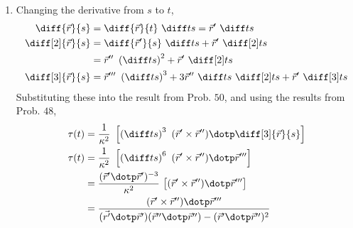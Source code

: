 \begin{enumerate}
    \item Changing the derivative from $ s $ to $ t $,
          \begin{align}
              \diff{\vec{r}}{s}    & = \diff{\vec{r}}{t}\ \diff ts
              = \vec{r}'\ \diff ts                                           \\
              \diff[2]{\vec{r}}{s} & = \diff{\vec{r}'}{s}\ \diff ts
              + \vec{r}'\ \diff[2] ts                                        \\
                                   & = \vec{r}''\ \left( \diff ts \right)^2
              + \vec{r}'\ \diff[2] ts                                        \\
              \diff[3]{\vec{r}}{s} & = \vec{r}'''\ \left( \diff ts \right)^3
              + 3\vec{r}''\ \diff ts \ \diff[2] ts
              + \vec{r}'\ \diff[3] ts
          \end{align}
          Substituting these into the result from Prob. $ 50 $, and using the results
          from Prob. $ 48 $,
          \begin{align}
              \tau(t) & = \frac{1}{\kappa^2}\ \left[ \left( \diff ts \right)^3\
              (\vec{r}' \times \vec{r}'') \dotp  \diff[3]{\vec{r}}{s} \right]   \\
              \tau(t) & = \frac{1}{\kappa^2}\ \left[ \left( \diff ts \right)^6\
              (\vec{r}' \times \vec{r}'') \dotp \vec{r}''' \right]              \\
                      & = \frac{(\vec{r}' \dotp \vec{r}')^{-3}}{\kappa^2}\
              \big[(\vec{r}' \times \vec{r}'') \dotp \vec{r}'''\big]            \\
                      & = \frac{(\vec{r}' \times \vec{r}'') \dotp \vec{r}'''}
              {(\vec{r'} \dotp \vec{r}')(\vec{r}'' \dotp \vec{r}'')
                  - (\vec{r}' \dotp \vec{r}'')^2}
          \end{align}


\end{enumerate}
